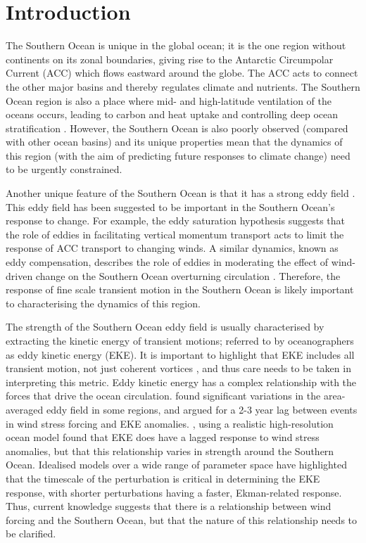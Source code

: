 \documentclass[linenumbers]{agujournal2019}
\begin{document}
%
%

\section{Introduction}

The Southern Ocean is unique in the global ocean; it is the one region without continents on its zonal boundaries, giving rise to the Antarctic Circumpolar Current (ACC) which flows eastward around the globe.
The ACC acts to connect the other major basins and thereby regulates climate and nutrients.
The Southern Ocean region is also a place where mid- and high-latitude ventilation of the oceans occurs, leading to carbon and heat uptake and controlling deep ocean stratification \citep{Rousselet2021, Morrison2022}.
However, the Southern Ocean is also poorly observed (compared with other ocean basins) and its unique properties mean that the dynamics of this region (with the aim of predicting future responses to climate change) need to be urgently constrained.

Another unique feature of the Southern Ocean is that it has a strong eddy field \citep{Fu2010}.
This eddy field has been suggested to be important in the Southern Ocean's response to change.
For example, the eddy saturation hypothesis \citep{Hallberg2006, Meredith-Hogg-2006, Munday2013, Constantinou2019} suggests that the role of eddies in facilitating vertical momentum transport acts to limit the response of ACC transport to changing winds.
A similar dynamics, known as eddy compensation, describes the role of eddies in moderating the effect of wind-driven change on the Southern Ocean overturning circulation \citep{Morrison2013a}.
Therefore, the response of fine scale transient motion in the Southern Ocean is likely important to characterising the dynamics of this region.

The strength of the Southern Ocean eddy field is usually characterised by extracting the kinetic energy of transient motions; referred to by oceanographers as eddy kinetic energy (EKE). 
It is important to highlight that EKE includes all transient motion, not just coherent vortices \citep{Martinez-Moreno2019}, and thus care needs to be taken in interpreting this metric.
Eddy kinetic energy has a complex relationship with the forces that drive the ocean circulation.
\citet{Meredith-Hogg-2006} found significant variations in the area-averaged eddy field in some regions, and argued for a 2-3 year lag between events in wind stress forcing and EKE anomalies.
\citet{Patara2016}, using a realistic high-resolution ocean model found that EKE does have a lagged response to wind stress anomalies, but that this relationship varies in strength around the Southern Ocean.
Idealised models over a wide range of parameter space \citep{Sinha2016} have highlighted that the timescale of the perturbation is critical in determining the EKE response, with shorter perturbations having a faster, Ekman-related response.
Thus, current knowledge suggests that there is a relationship between wind forcing and the Southern Ocean, but that the nature of this relationship needs to be clarified.
\end{document}
